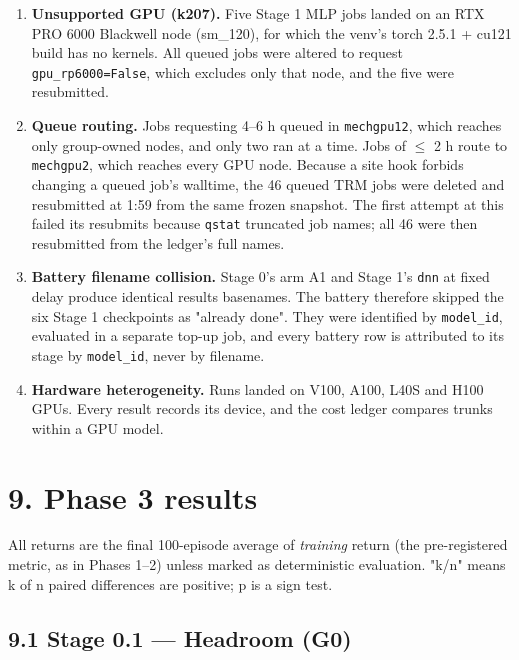 \documentclass[11pt]{article}
\begin{document}
\begin{enumerate}
\item \textbf{Unsupported GPU (k207).} Five Stage 1 MLP jobs landed on an RTX PRO 6000 Blackwell node (sm\_120), for which the venv's torch 2.5.1 + cu121 build has no kernels. All queued jobs were altered to request \texttt{gpu\_\allowbreak{}rp6000=False}, which excludes only that node, and the five were resubmitted.
\item \textbf{Queue routing.} Jobs requesting 4--6 h queued in \texttt{mechgpu12}, which reaches only group-owned nodes, and only two ran at a time. Jobs of $\leq$ 2 h route to \texttt{mechgpu2}, which reaches every GPU node. Because a site hook forbids changing a queued job's walltime, the 46 queued TRM jobs were deleted and resubmitted at 1:59 from the same frozen snapshot. The first attempt at this failed its resubmits because \texttt{qstat} truncated job names; all 46 were then resubmitted from the ledger's full names.
\item \textbf{Battery filename collision.} Stage 0's arm A1 and Stage 1's \texttt{dnn} at fixed delay produce identical results basenames. The battery therefore skipped the six Stage 1 checkpoints as "already done". They were identified by \texttt{model\_id}, evaluated in a separate top-up job, and every battery row is attributed to its stage by \texttt{model\_id}, never by filename.
\item \textbf{Hardware heterogeneity.} Runs landed on V100, A100, L40S and H100 GPUs. Every result records its device, and the cost ledger compares trunks within a GPU model.
\end{enumerate}



\medskip



\section*{9. Phase 3 results}



All returns are the final 100-episode average of \emph{training} return (the pre-registered metric, as in Phases 1--2) unless marked as deterministic evaluation. "k/n" means k of n paired differences are positive; p is a sign test.



\subsection*{9.1 Stage 0.1 --- Headroom (G0)}
\end{document}
